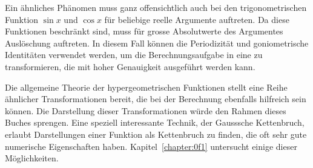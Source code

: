 Ein ähnliches Phänomen muss ganz offensichtlich auch bei den
trigonometrischen Funktion $\sin x$ und $\cos x$ für beliebige
reelle Argumente auftreten.
Da diese Funktionen beschränkt sind, muss für grosse Absolutwerte
des Argumentes Auslöschung auftreten.
In diesem Fall können die Periodizität und goniometrische
Identitäten verwendet werden, um die Berechnungsaufgabe in eine zu
transformieren, die mit hoher Genauigkeit ausgeführt werden kann.

Die allgemeine Theorie der hypergeometrischen Funktionen stellt
eine Reihe ähnlicher Transformationen bereit, die bei der Berechnung
ebenfalls hilfreich sein können.
Die Darstellung dieser Transformationen würde den Rahmen dieses
Buches sprengen.
Eine speziell interessante Technik, der Gausssche Kettenbruch,
erlaubt Darstellungen einer Funktion als Kettenbruch zu finden, die
oft sehr gute numerische Eigenschaften haben.
Kapitel~\ref{chapter:0f1} untersucht einige dieser Möglichkeiten.


